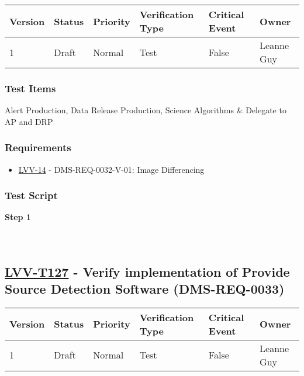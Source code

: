 \begin{longtable}[]{@{}llllll@{}}
\toprule
Version & Status & Priority & Verification Type & Critical Event &
Owner\tabularnewline
\midrule
\endhead
1 & Draft & Normal & Test & False & Leanne Guy\tabularnewline
\bottomrule
\end{longtable}

\hypertarget{test-items-26}{%
\subsubsection{Test Items}\label{test-items-26}}

Alert Production, Data Release Production, Science Algorithms \&
Delegate to AP and DRP

\hypertarget{requirements-26}{%
\subsubsection{Requirements}\label{requirements-26}}

\begin{itemize}
\tightlist
\item
  \href{https://jira.lsstcorp.org/browse/LVV-14}{LVV-14} -
  DMS-REQ-0032-V-01: Image Differencing
\end{itemize}

\hypertarget{test-script-26}{%
\subsubsection{Test Script}\label{test-script-26}}

\textbf{Step 1}\\
~\\
~\\

\hypertarget{lvv-t127---verify-implementation-of-provide-source-detection-software-dms-req-0033}{%
\subsection{\texorpdfstring{\href{https://jira.lsstcorp.org/secure/Tests.jspa\#/testCase/LVV-T127}{LVV-T127}
- Verify implementation of Provide Source Detection Software
(DMS-REQ-0033)}{LVV-T127 - Verify implementation of Provide Source Detection Software (DMS-REQ-0033)}}\label{lvv-t127---verify-implementation-of-provide-source-detection-software-dms-req-0033}}

\begin{longtable}[]{@{}llllll@{}}
\toprule
Version & Status & Priority & Verification Type & Critical Event &
Owner\tabularnewline
\midrule
\endhead
1 & Draft & Normal & Test & False & Leanne Guy\tabularnewline
\bottomrule
\end{longtable}

